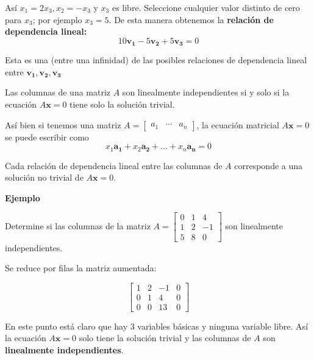 \documentclass{article}
\begin{document}
Así $x_1 = 2x_3, x_2 = -x_3$ y $x_3$ es libre. Seleccione cualquier valor distinto de cero para $x_3$; por ejemplo $x_3 = 5$. De esta manera obtenemos la \textbf{relación de dependencia lineal:}$$10\mathbf{v_1} - 5\mathbf{v_2} + 5\mathbf{v_3}=0$$

Esta es una (entre una infinidad) de las posibles relaciones de dependencia lineal entre $\mathbf{v_1}, \mathbf{v_2}, \mathbf{v_3}$

\begin{tcolorbox}[colback=blue!10!white,colframe=blue!60!black,title=Columnas de una Matriz]
    Las columnas de una matriz $A$ son linealmente independientes si y solo si la ecuación $A\mathbf{x} = 0$ tiene solo la solución trivial.
\end{tcolorbox}

Así bien si tenemos una matriz $A = \begin{bmatrix} a_1 & \dotsb & a_n \end{bmatrix}$, la ecuación matricial  $A\mathbf{x} = 0$ se puede escribir como $$x_1\mathbf{a_1} + x_2\mathbf{a_2} + ... + x_n\mathbf{a_n} = 0$$

Cada relación de dependencia lineal entre las columnas de $A$ corresponde a una solución no trivial de $A\mathbf{x} = 0$.

\begin{large}
    \textbf{Ejemplo}
\end{large}

Determine si las columnas de la matriz $A = \begin{bmatrix}
    0 & 1 & 4\\
    1 & 2 & -1\\
    5 & 8 & 0
\end{bmatrix}$ son linealmente independientes.

Se reduce por filas la matriz aumentada:

\begin{equation*}
    \left[\begin{array}{rrr|r}
        1 & 2 & -1 & 0 \\
        0 & 1 & 4 & 0 \\
        0 & 0 & 13 & 0
        \end{array}\right]
\end{equation*}

En este punto está claro que hay 3 variables básicas y ninguna variable libre. Así la ecuación $A\mathbf{x} = 0$ solo tiene la solución trivial y las columnas de $A$ son \textbf{linealmente independientes}.
\end{document}
